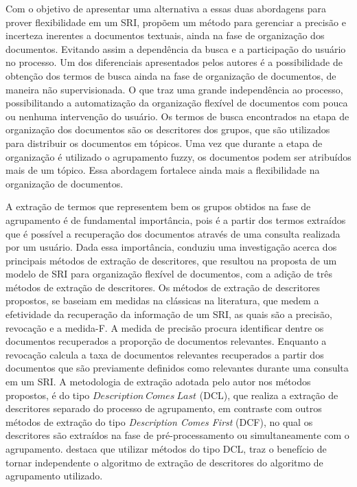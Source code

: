 Com o objetivo de apresentar uma alternativa a essas duas abordagens para prover flexibilidade em um
SRI,  propõem um método para gerenciar a precisão e incerteza inerentes a
documentos textuais, ainda na fase de organização dos documentos. Evitando assim a dependência da
busca e a participação do usuário no processo. Um dos diferenciais apresentados pelos
autores é a possibilidade de obtenção dos termos de busca ainda na fase de organização de
documentos, de maneira não supervisionada. O que traz uma grande independência ao processo,
possibilitando a automatização da organização flexível de documentos com pouca ou nenhuma
intervenção do usuário. Os termos de busca encontrados na etapa de organização
dos documentos são os descritores dos grupos, que são utilizados para distribuir os documentos em
tópicos. Uma vez que durante a etapa de organização é utilizado o agrupamento fuzzy, os
documentos podem ser atribuídos mais de um tópico. Essa abordagem fortalece
ainda mais a flexibilidade na organização de documentos.

A extração de termos
que representem bem os grupos obtidos na fase de agrupamento é de fundamental importância, pois é
a partir dos termos extraídos que é possível a recuperação dos documentos através de uma consulta 
realizada por um usuário. Dada essa importância,  conduziu uma investigação
acerca dos principais métodos de extração de descritores, que resultou na proposta de um
modelo de SRI para organização flexível de documentos, com
a adição de três métodos de extração de descritores. Os métodos de extração de descritores 
propostos, se baseiam em medidas na clássicas na literatura, que medem a efetividade da 
recuperação da informação de um SRI, as quais são a precisão, revocação e a medida-F. 
A medida de precisão procura identificar dentre os documentos recuperados a proporção de documentos
relevantes. Enquanto a revocação calcula a taxa de documentos relevantes recuperados a partir dos
documentos que são previamente definidos como relevantes durante uma consulta em um SRI.
A metodologia de extração adotada pelo autor nos métodos propostos, 
é do tipo $Description\ Comes\ Last$ (DCL), que
realiza a extração de descritores separado do processo de agrupamento, em contraste com outros
métodos de extração do tipo \textit{Description Comes First\/} (DCF), no qual os descritores 
são extraídos na
fase de pré-processamento ou simultaneamente com o agrupamento.  destaca que
utilizar métodos do tipo DCL, traz o benefício de tornar independente o algoritmo de extração de
descritores do algoritmo de agrupamento utilizado. 


